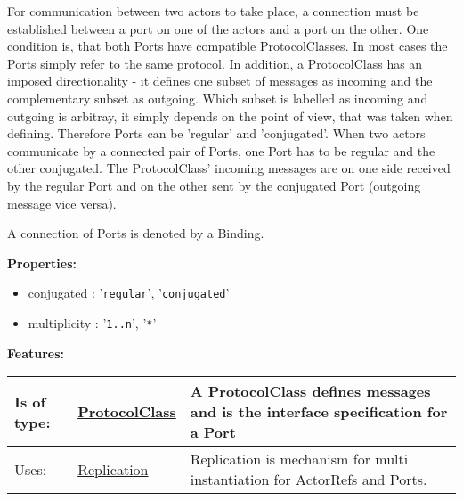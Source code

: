 	For communication between two actors to take place, a connection must be established between a port on one of the actors and a port on the other.
	One condition is, that both Ports have compatible ProtocolClasses. In most cases the Ports simply refer to the same protocol.
	In addition, a ProtocolClass has an imposed directionality - it defines one subset of messages as incoming and the complementary subset as outgoing.
	Which subset is labelled as incoming and outgoing is arbitray, it simply depends on the point of view, that was taken when defining.
	Therefore Ports can be 'regular' and 'conjugated'. When two actors communicate by a connected pair of Ports, one Port has to be regular and the other conjugated.
	The ProtocolClass' incoming messages are on one side received by the regular Port and on the other sent by the conjugated Port (outgoing message vice versa).
	
	A connection of Ports is denoted by a Binding. 
		
	\textbf{Properties:}
	\begin{itemize}
	\item conjugated : '\verb|regular|', '\verb|conjugated|'
	\item multiplicity : '\verb|1..n|', '\verb|*|'
	\end{itemize}
		
	\begingroup
	\textbf{Features:}
	\renewcommand{\arraystretch}{1.8} %
	\begin{longtable}{l|l p{}}
		\hline
	Is of type: & \tabitem \hyperlink{ref:ProtocolClass}{ProtocolClass}  & A ProtocolClass defines messages and is the interface specification for a Port\\
	\hline
	Uses: & \tabitem \hyperlink{ref:Replication}{Replication}  & Replication is mechanism for multi instantiation for ActorRefs and Ports.\\
	\hline
	\end{longtable}
	\endgroup
		
